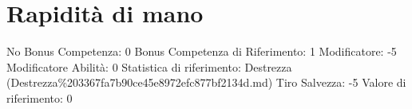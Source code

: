 \section{Rapidità di mano}\label{rapidituxe0-di-mano}

\begin{description}
\tightlist
\item[Tags: ABI]
No Bonus Competenza: 0 Bonus Competenza di Riferimento: 1 Modificatore:
-5 Modificatore Abilità: 0 Statistica di riferimento: Destrezza
(Destrezza\%203367fa7b90ce45e8972efc877bf2134d.md) Tiro Salvezza: -5
Valore di riferimento: 0
\end{description}
